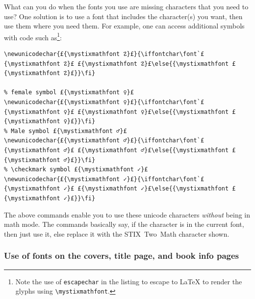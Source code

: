 \documentclass[12pt, twoside]{article}
\begin{document}
What can you do when the fonts you use are missing characters that you need to use? One solution is to use a font that includes the character(s) you want, then use them where you need them. For example, one can access additional symbols with code such as\footnote{Note the use of \texttt{escapechar} in the listing to escape to \LaTeX{} to render the glyphs using \texttt{\textbackslash mystixmathfont}.}:
\begin{lstlisting}[basicstyle=\footnotesize, escapechar=£]
% dangerous bend (caution Sign) £{\mystixmathfont ☡}£
\newunicodechar{£{\mystixmathfont ☡}£}{\iffontchar\font`£{\mystixmathfont ☡}£ £{\mystixmathfont ☡}£\else{{\mystixmathfont £{\mystixmathfont ☡}£}}\fi}

% female symbol £{\mystixmathfont ♀}£
\newunicodechar{£{\mystixmathfont ♀}£}{\iffontchar\font`£{\mystixmathfont ♀}£ £{\mystixmathfont ♀}£\else{{\mystixmathfont £{\mystixmathfont ♀}£}}\fi}
% Male symbol £{\mystixmathfont ♂}£
\newunicodechar{£{\mystixmathfont ♂}£}{\iffontchar\font`£{\mystixmathfont ♂}£ £{\mystixmathfont ♂}£\else{{\mystixmathfont £{\mystixmathfont ♂}£}}\fi}
% \checkmark symbol £{\mystixmathfont ✓}£
\newunicodechar{£{\mystixmathfont ✓}£}{\iffontchar\font`£{\mystixmathfont ✓}£ £{\mystixmathfont ✓}£\else{{\mystixmathfont £{\mystixmathfont ✓}£}}\fi}
\end{lstlisting}


\noindent The above commands enable you to use these unicode characters \textit{without} being in math mode. The commands basically say, if the character is in the current font, then just use it, else replace it with the \gls{STIX}~Two~Math character shown.



\subsubsection{Use of fonts on the covers, title page, and book info pages}
\label{sec:cycle3useOfFontsonCovers}
\end{document}
